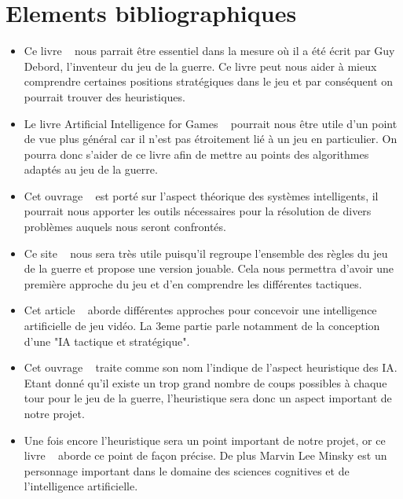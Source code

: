 \documentclass[12pt]{article}
\begin{document}
\section{Elements bibliographiques}
\begin{itemize}
\item Ce livre ~\cite{ref1} nous parrait être essentiel dans la mesure où il a été écrit par Guy Debord, l'inventeur du jeu de la guerre. Ce livre peut nous aider à mieux comprendre certaines positions stratégiques dans le jeu et par conséquent on pourrait trouver des heuristiques. 
\\[1\baselineskip]

\item Le livre Artificial Intelligence for Games ~\cite{ref2} pourrait nous être utile d'un point de vue plus général car il n'est pas étroitement lié à un jeu en particulier. On pourra donc s'aider de ce livre afin de mettre au points des algorithmes adaptés au jeu de la guerre.\\[1\baselineskip]

\item Cet ouvrage ~\cite{ref3} est porté sur l'aspect théorique des systèmes intelligents, il pourrait nous apporter les outils nécessaires pour la résolution de divers problèmes auquels nous seront confrontés.\\[1\baselineskip]

\item Ce site ~\cite{ref4} nous sera très utile puisqu'il regroupe l'ensemble des règles du jeu de la guerre et propose une version jouable. Cela nous permettra d'avoir une première approche du jeu et d'en comprendre les différentes tactiques.\\[1\baselineskip]

\item Cet article ~\cite{ref6} aborde différentes approches pour concevoir une intelligence artificielle de jeu vidéo. La 3eme partie parle notamment de la conception d'une "IA tactique et stratégique".\\[1\baselineskip]

\item Cet ouvrage ~\cite{ref7} traite comme son nom l'indique de l'aspect heuristique des IA. Etant donné qu'il existe un trop grand nombre de coups possibles à chaque tour pour le jeu de la guerre, l'heuristique sera donc un aspect important de notre projet.\\[1\baselineskip]

\item Une fois encore l'heuristique sera un point important de notre projet, or ce livre ~\cite{ref8} aborde ce point de façon précise. De plus Marvin Lee Minsky est un personnage important dans le domaine des sciences cognitives et de l'intelligence artificielle.\\[1\baselineskip]


\end{itemize}
\end{document}
